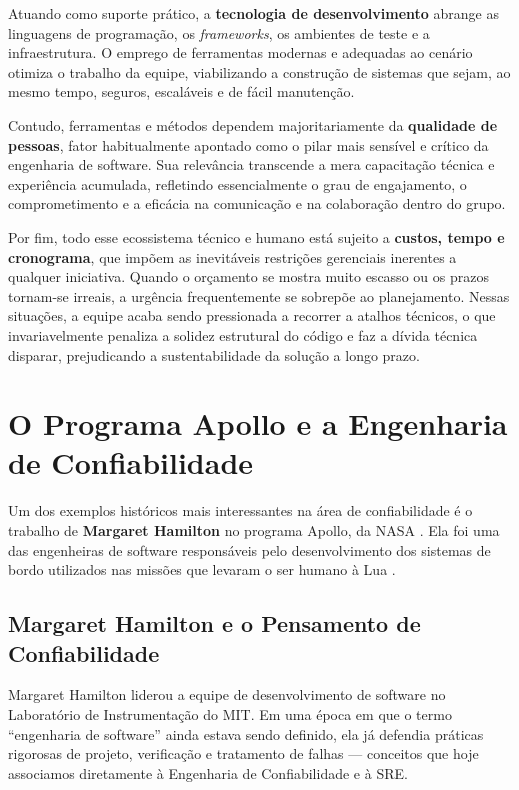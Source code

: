 \documentclass[12pt,a4paper,twoside]{report}
\begin{document}
Atuando como suporte prático, a \textbf{tecnologia de desenvolvimento} abrange as linguagens de programação, os \emph{frameworks}, os ambientes de teste e a infraestrutura. O emprego de ferramentas modernas e adequadas ao cenário otimiza o trabalho da equipe, viabilizando a construção de sistemas que sejam, ao mesmo tempo, seguros, escaláveis e de fácil manutenção.

Contudo, ferramentas e métodos dependem majoritariamente da \textbf{qualidade de pessoas}, fator habitualmente apontado como o pilar mais sensível e crítico da engenharia de software. Sua relevância transcende a mera capacitação técnica e experiência acumulada, refletindo essencialmente o grau de engajamento, o comprometimento e a eficácia na comunicação e na colaboração dentro do grupo.

Por fim, todo esse ecossistema técnico e humano está sujeito a \textbf{custos, tempo e cronograma}, que impõem as inevitáveis restrições gerenciais inerentes a qualquer iniciativa. Quando o orçamento se mostra muito escasso ou os prazos tornam-se irreais, a urgência frequentemente se sobrepõe ao planejamento. Nessas situações, a equipe acaba sendo pressionada a recorrer a atalhos técnicos, o que invariavelmente penaliza a solidez estrutural do código e faz a dívida técnica disparar, prejudicando a sustentabilidade da solução a longo prazo.

\section{O Programa Apollo e a Engenharia de Confiabilidade}

Um dos exemplos históricos mais interessantes na área de confiabilidade é o
trabalho de \textbf{Margaret Hamilton} no programa Apollo, da NASA \cite{hamilton1976apollo, fisher2019moon}. Ela foi
uma das engenheiras de software responsáveis pelo desenvolvimento dos sistemas
de bordo utilizados nas missões que levaram o ser humano à Lua \cite{garman2011apollo}.

\subsection{Margaret Hamilton e o Pensamento de Confiabilidade}

Margaret Hamilton liderou a equipe de desenvolvimento de software no
Laboratório de Instrumentação do MIT. Em uma época em que o termo
``engenharia de software'' ainda estava sendo definido, ela já defendia
práticas rigorosas de projeto, verificação e tratamento de falhas --- conceitos
que hoje associamos diretamente à Engenharia de Confiabilidade e à SRE.
\end{document}
